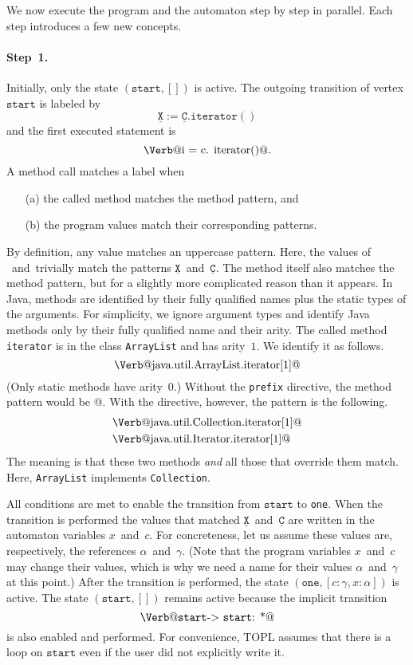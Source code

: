 \documentclass{sigplanconf} %
\makeatletter
\newcommand{\pattern}[1]{\ensuremath{\mathtt{\underline{#1}}}}
\newcommand{\start}{\ensuremath{\mathtt{start}}\xspace}
\newcommand{\verbline}[2][]{\[\text{\Verb@#2@}#1\]}
\theoremstyle{definition}
\theoremstyle{remark}
\makeatother
\begin{document}
We now execute the program and the automaton step by step in parallel.
Each step introduces a few new concepts.

\paragraph{Step~1.}

Initially, only the state $(\start,[])$ is active.
The outgoing transition of vertex \start is labeled by \[\pattern X:=\pattern{C}.\mathtt{iterator}()\] and the first executed statement is \verbline[.]{i = c.\PY{n+na}{iterator}()}
A method call matches a label when
\begin{itemize}
\item[(a)] the called method matches the method pattern, and
\item[(b)] the program values match their corresponding patterns.
\end{itemize}
By definition, any value matches an uppercase pattern.
Here, the values of \Verb@i@~and~\Verb@c@ trivially match the patterns \pattern X~and~\pattern C.
The method itself also matches the method pattern, but for a slightly more complicated reason than it appears.
In Java, methods are identified by their fully qualified names plus the static types of the arguments.
For simplicity, we ignore argument types and identify Java methods only by their fully qualified name and their arity.
The called method \texttt{iterator} is in the class \texttt{ArrayList} and has arity~$1$.
We identify it as follows.
\verbline{java.util.ArrayList.iterator[1]}
(Only static methods have arity~$0$.)
Without the \texttt{prefix} directive, the method pattern would be \Verb@iterator[1]@.
With the directive, however, the pattern is the following.
\begin{align*}
&\text{\Verb@java.util.Collection.iterator[1]@} \\
&\text{\Verb@java.util.Iterator.iterator[1]@}
\end{align*}
The meaning is that these two methods \emph{and} all those that override them match.
Here, \texttt{ArrayList} implements \texttt{Collection}.

All conditions are met to enable the transition from \start to \texttt{one}.
When the transition is performed the values that matched \pattern X~and~\pattern C are written in the automaton variables $x$~and~$c$.
For concreteness, let us assume these values are, respectively, the references $\alpha$~and~$\gamma$.
(Note that the program variables $x$~and~$c$ may change their values, which is why we need a name for their values $\alpha$~and~$\gamma$ at this point.)
After the transition is performed, the state $(\mathtt{one},[c:\gamma,x:\alpha])$ is active.
The state $(\start,[])$ remains active because the implicit transition \verbline{\start -> \start: *} is also enabled and performed.
For convenience, TOPL assumes that there is a loop on \start even if the user did not explicitly write it.
\end{document}
